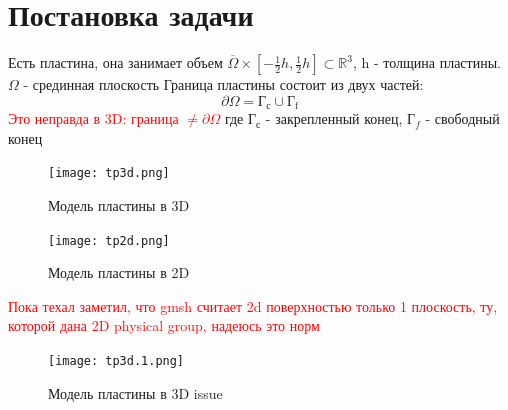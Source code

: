 \documentclass[a4paper,12pt]{article}
\begin{document}
\section{Постановка задачи}
Есть пластина, она занимает объем $\overline{\Omega} \times [-\frac{1}{2}h, \frac{1}{2}h] \subset \mathbb{R}^3$, h - толщина пластины. $\Omega$ - срединная плоскость Граница пластины состоит из двух частей:
\begin{equation}
    \partial \Omega = \text{Г}_{\text{с}} \cup \text{Г}_{\text{f}}
\end{equation}
\textcolor{red}{Это неправда в 3D: граница $\ne \partial\Omega$ }
где $\text{Г}_{\text{с}}$ - закрепленный конец, $\text{Г}_f$ - свободный конец
\begin{figure}[H]
	\begin{center}
		\texttt{[image: tp3d.png]}
		\caption{Модель пластины в 3D}
	\end{center}
\end{figure}

\begin{figure}[H]
	\begin{center}
		\texttt{[image: tp2d.png]}
		\caption{Модель пластины в 2D}
	\end{center}
\end{figure}
\textcolor{red}{Пока техал заметил, что gmsh считает 2d поверхностью только 1 плоскость, ту, которой дана 2D physical group, надеюсь это норм}
\begin{figure}[H]
	\begin{center}
		\texttt{[image: tp3d.1.png]}
		\caption{Модель пластины в 3D issue}
	\end{center}
\end{figure}
\end{document}
